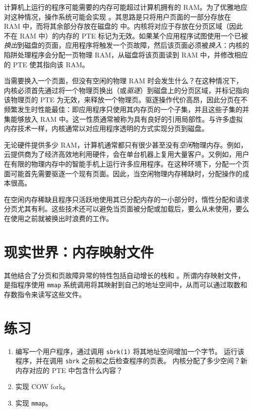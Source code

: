 计算机上运行的程序可能需要的内存可能超过计算机拥有的 RAM。为了优雅地应对这种情况，操作系统可能会实现 。其思路是只将用户页面的一部分存放在 RAM 中，而将其余部分存放在磁盘的  中。内核将对应于存放在分页区域（因此不在 RAM 中）的内存的 PTE 标记为无效。如果某个应用程序试图使用一个已被{\it 换出}到磁盘的页面，应用程序将触发一个页故障，然后该页面必须被{\it 换入}：内核的陷阱处理程序会分配一页物理 RAM，从磁盘将该页面读到 RAM 中，并修改相应的 PTE 使其指向该 RAM。

当需要换入一个页面，但没有空闲的物理 RAM 时会发生什么？在这种情况下，内核必须首先通过将一个物理页换出（或{\it 驱逐}）到磁盘上的分页区域，并标记指向该物理页的 PTE 为无效，来释放一个物理页。驱逐操作代价高昂，因此分页在不频繁发生时性能最佳：即应用程序只使用其内存页的一个子集，并且这些子集的并集能够放入 RAM 中。这一性质通常被称为具有良好的引用局部性。与许多虚拟内存技术一样，内核通常以对应用程序透明的方式实现分页到磁盘。

无论硬件提供多少 RAM，计算机通常都只有很少甚至没有{\it 空闲}物理内存。例如，云提供商为了经济高效地利用硬件，会在单台机器上复用大量客户。又例如，用户在有限的物理内存中的智能手机上运行许多应用程序。在这种环境下，分配一个页面可能首先需要驱逐一个现有页面。因此，当空闲物理内存稀缺时，分配操作的成本很高。

在空闲内存稀缺且程序只活跃地使用其已分配内存的一小部分时，惰性分配和请求分页尤其有利。这些技术还可以避免当页面被分配或加载后，要么从未使用，要么在使用之前就被换出时浪费的工作。

\section{现实世界：内存映射文件}

其他结合了分页和页故障异常的特性包括自动增长的栈和 。所谓内存映射文件，是指程序使用 \texttt{mmap} 系统调用将其映射到自己的地址空间中，从而可以通过取数和存数指令来读写这些文件。


\section{练习}

\begin{enumerate}

\item 编写一个用户程序，通过调用 \lstinline{sbrk(1)} 将其地址空间增加一个字节。
运行该程序，并在调用 \lstinline{sbrk} 之前和之后检查程序的页表。
内核分配了多少空间？新内存对应的 PTE 中包含什么内容？

\item 实现 COW fork。

\item 实现 {\tt mmap}。

\end{enumerate}
